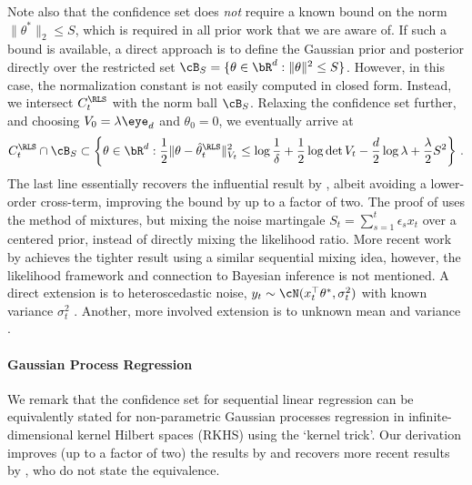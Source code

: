 Note also that the confidence set does \emph{not} require a known bound on the norm $\|\theta^*\|_2 \leq S$, which is required in all prior work that we are aware of. If such a bound is available, a direct approach is to define the Gaussian prior and posterior directly over the restricted set $\cB_S = \{\theta \in \bR^d : \|\theta\|^2 \leq S\}$. However, in this case, the normalization constant is not easily computed in closed form. Instead, we intersect $C_t^\RLS$ with the norm ball $\cB_S$. Relaxing the confidence set further, and choosing $V_0 = \lambda \eye_d$ and $\theta_0 = 0$, we eventually arrive at
\begin{align*}
    C_t^\RLS \cap \cB_S \subset \left\{ \theta \in \bR^d : \frac{1}{2} \|\theta - \hat \theta_t^\RLS\|_{V_t}^2 \leq \log \frac{1}{\delta} + \frac{1}{2}\log \det V_t - \frac{d}{2}\log \lambda+ \frac{\lambda}{2}S^2 \right\} \,.
\end{align*}
The last line essentially recovers the influential result by \citet{abbasi2011improved}, albeit avoiding a lower-order cross-term, improving the bound by up to a factor of two. 
The proof of \citet{abbasi2011improved} uses the method of mixtures, but mixing the noise martingale $S_t = \sum_{s=1}^t \epsilon_s x_t$ over a centered prior, instead of directly mixing the likelihood ratio. 
More recent work by \cite{flynn2024improved} achieves the tighter result using a similar sequential mixing idea, however, the likelihood framework and connection to Bayesian inference is not mentioned. A direct extension is to heteroscedastic noise, $y_t \sim \cN(x_t^\top\theta^*, \sigma_t^2)$ with known variance $\sigma_t^2$ \citep[c.f.,][]{kirschner2018information}. Another, more involved extension is to unknown mean and variance \cite[c.f.,][]{chowdhury2023bregman}. 

\paragraph{Gaussian Process Regression}
We remark that the confidence set for sequential linear regression can be equivalently stated for non-parametric Gaussian processes regression in infinite-dimensional kernel Hilbert spaces (RKHS) using the `kernel trick'. Our derivation improves (up to a factor of two) the results by \cite{abbasi2012thesis,chowdhury2017kernelized,whitehouse2023sublinear} and recovers more recent results by \cite{neiswanger2021uncertainty,flynn2024tighter}, who do not state the equivalence.



